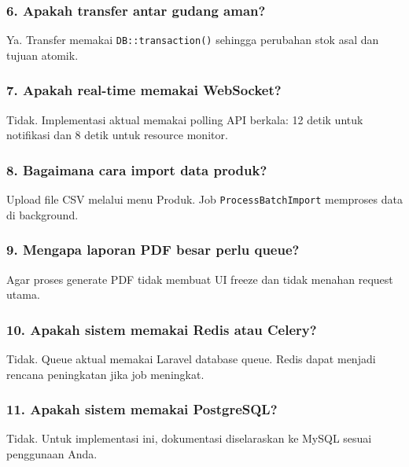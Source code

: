 \documentclass[
]{article}
\begin{document}
\subsubsection{6. Apakah transfer antar gudang
aman?}\label{6-apakah-transfer-antar-gudang-aman}

Ya. Transfer memakai \texttt{DB::transaction()} sehingga perubahan stok
asal dan tujuan atomik.

\subsubsection{7. Apakah real-time memakai
WebSocket?}\label{7-apakah-real-time-memakai-websocket}

Tidak. Implementasi aktual memakai polling API berkala: 12 detik untuk
notifikasi dan 8 detik untuk resource monitor.

\subsubsection{8. Bagaimana cara import data
produk?}\label{8-bagaimana-cara-import-data-produk}

Upload file CSV melalui menu Produk. Job \texttt{ProcessBatchImport}
memproses data di background.

\subsubsection{9. Mengapa laporan PDF besar perlu
queue?}\label{9-mengapa-laporan-pdf-besar-perlu-queue}

Agar proses generate PDF tidak membuat UI freeze dan tidak menahan
request utama.

\subsubsection{10. Apakah sistem memakai Redis atau
Celery?}\label{10-apakah-sistem-memakai-redis-atau-celery}

Tidak. Queue aktual memakai Laravel database queue. Redis dapat menjadi
rencana peningkatan jika job meningkat.

\subsubsection{11. Apakah sistem memakai
PostgreSQL?}\label{11-apakah-sistem-memakai-postgresql}

Tidak. Untuk implementasi ini, dokumentasi diselaraskan ke MySQL sesuai
penggunaan Anda.
\end{document}
